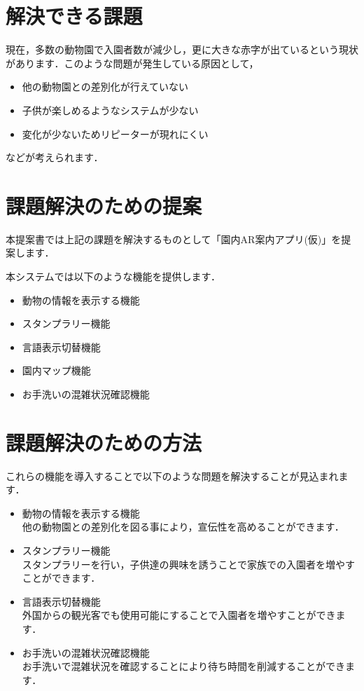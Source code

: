 \documentclass[a4j]{jarticle}
\begin{document}
\section{解決できる課題}
現在，多数の動物園で入園者数が減少し，更に大きな赤字が出ているという現状があります．このような問題が発生している原因として，
\begin{itemize}
	\item 他の動物園との差別化が行えていない
	\item 子供が楽しめるようなシステムが少ない
	\item 変化が少ないためリピーターが現れにくい
\end{itemize}
などが考えられます．



\section{課題解決のための提案}
本提案書では上記の課題を解決するものとして「園内AR案内アプリ(仮)」を提案します．

本システムでは以下のような機能を提供します．

\begin{itemize}
	\item 動物の情報を表示する機能
	\item スタンプラリー機能
	\item 言語表示切替機能
	\item 園内マップ機能
	\item お手洗いの混雑状況確認機能
\end{itemize}


\section{課題解決のための方法}
これらの機能を導入することで以下のような問題を解決することが見込まれます．

\begin{itemize}
	\item 動物の情報を表示する機能\\
	他の動物園との差別化を図る事により，宣伝性を高めることができます．
	\item スタンプラリー機能\\
	スタンプラリーを行い，子供達の興味を誘うことで家族での入園者を増やすことができます．
	\item 言語表示切替機能\\
	外国からの観光客でも使用可能にすることで入園者を増やすことができます．
	
	\item お手洗いの混雑状況確認機能\\
	お手洗いで混雑状況を確認することにより待ち時間を削減することができます．
\end{itemize}
\end{document}
